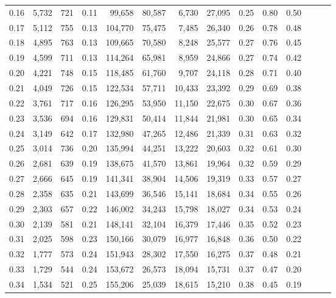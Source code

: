 \begin{tabular}{rrrrrrrrrrrrrr}
0.16 &  5,732 &  721 &  0.11 &   99,658 &   80,587 &   6,730 &  27,095 &  0.25 &  0.80 &      0.50 \\
0.17 &  5,112 &  755 &  0.13 &  104,770 &   75,475 &   7,485 &  26,340 &  0.26 &  0.78 &      0.48 \\
0.18 &  4,895 &  763 &  0.13 &  109,665 &   70,580 &   8,248 &  25,577 &  0.27 &  0.76 &      0.45 \\
0.19 &  4,599 &  711 &  0.13 &  114,264 &   65,981 &   8,959 &  24,866 &  0.27 &  0.74 &      0.42 \\
0.20 &  4,221 &  748 &  0.15 &  118,485 &   61,760 &   9,707 &  24,118 &  0.28 &  0.71 &      0.40 \\
0.21 &  4,049 &  726 &  0.15 &  122,534 &   57,711 &  10,433 &  23,392 &  0.29 &  0.69 &      0.38 \\
0.22 &  3,761 &  717 &  0.16 &  126,295 &   53,950 &  11,150 &  22,675 &  0.30 &  0.67 &      0.36 \\
0.23 &  3,536 &  694 &  0.16 &  129,831 &   50,414 &  11,844 &  21,981 &  0.30 &  0.65 &      0.34 \\
0.24 &  3,149 &  642 &  0.17 &  132,980 &   47,265 &  12,486 &  21,339 &  0.31 &  0.63 &      0.32 \\
0.25 &  3,014 &  736 &  0.20 &  135,994 &   44,251 &  13,222 &  20,603 &  0.32 &  0.61 &      0.30 \\
0.26 &  2,681 &  639 &  0.19 &  138,675 &   41,570 &  13,861 &  19,964 &  0.32 &  0.59 &      0.29 \\
0.27 &  2,666 &  645 &  0.19 &  141,341 &   38,904 &  14,506 &  19,319 &  0.33 &  0.57 &      0.27 \\
0.28 &  2,358 &  635 &  0.21 &  143,699 &   36,546 &  15,141 &  18,684 &  0.34 &  0.55 &      0.26 \\
0.29 &  2,303 &  657 &  0.22 &  146,002 &   34,243 &  15,798 &  18,027 &  0.34 &  0.53 &      0.24 \\
0.30 &  2,139 &  581 &  0.21 &  148,141 &   32,104 &  16,379 &  17,446 &  0.35 &  0.52 &      0.23 \\
0.31 &  2,025 &  598 &  0.23 &  150,166 &   30,079 &  16,977 &  16,848 &  0.36 &  0.50 &      0.22 \\
0.32 &  1,777 &  573 &  0.24 &  151,943 &   28,302 &  17,550 &  16,275 &  0.37 &  0.48 &      0.21 \\
0.33 &  1,729 &  544 &  0.24 &  153,672 &   26,573 &  18,094 &  15,731 &  0.37 &  0.47 &      0.20 \\
0.34 &  1,534 &  521 &  0.25 &  155,206 &   25,039 &  18,615 &  15,210 &  0.38 &  0.45 &      0.19 \\

\end{tabular}
